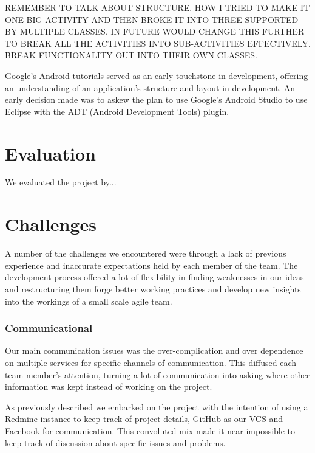 \documentclass{l3proj}
\begin{document}
REMEMBER TO TALK ABOUT STRUCTURE. HOW I TRIED TO MAKE IT ONE BIG ACTIVITY AND
THEN BROKE IT INTO THREE SUPPORTED BY MULTIPLE CLASSES. IN FUTURE WOULD CHANGE
THIS FURTHER TO BREAK ALL THE ACTIVITIES INTO SUB-ACTIVITIES EFFECTIVELY. BREAK
FUNCTIONALITY OUT INTO THEIR OWN CLASSES.

Google's Android tutorials served as an early touchstone in development,
offering an understanding of an application's structure and layout in
development. An early decision made was to askew the plan to use Google's
Android Studio to use Eclipse with the ADT (Android Development Tools) plugin.

\chapter{Evaluation}

We evaluated the project by...

\chapter{Challenges}
\label{Challenges}

A number of the challenges we encountered were through a lack of previous
experience and inaccurate expectations held by each member of the team. The
development process offered a lot of flexibility in finding weaknesses in our
ideas and restructuring them forge better working practices and develop new
insights into the workings of a small scale agile team.

\subsection{Communicational}
Our main communication issues was the over-complication and over dependence on multiple services for specific channels of communication. This diffused each team member's attention, turning a lot of communication into asking where other information was kept instead of working on the project.

As previously described we embarked on the project with the intention of using a Redmine instance to keep track of project details, GitHub as our VCS and Facebook for communication. This convoluted mix made it near impossible to keep track of discussion about specific issues and problems.
\end{document}
